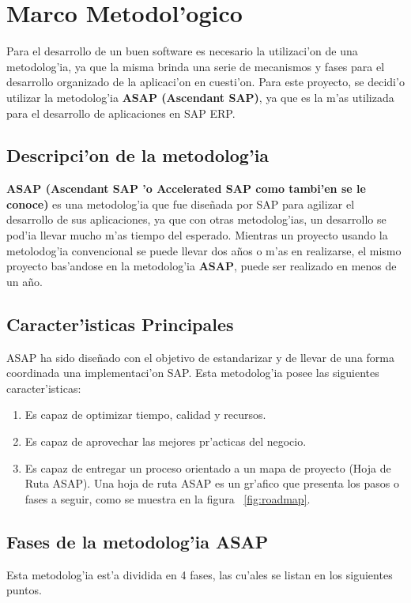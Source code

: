 \chapter{Marco Metodol'ogico} \label{chap:metodologia}
Para el desarrollo de un buen software es necesario la utilizaci'on de una metodolog'ia, ya que la misma brinda una serie de mecanismos y fases para el desarrollo organizado de la aplicaci'on en cuesti'on.
\newline
\newline
Para este proyecto, se decidi'o utilizar la metodolog'ia \textbf{ASAP (Ascendant SAP)}, ya que es la m'as utilizada para el desarrollo de aplicaciones en SAP ERP.
\section{Descripci'on de la metodolog'ia}
\textbf{ASAP (Ascendant SAP 'o Accelerated SAP como tambi'en se le conoce)} es una metodolog'ia que fue dise\~nada por SAP para agilizar el desarrollo de sus aplicaciones, ya que con otras metodolog'ias, un desarrollo se pod'ia llevar mucho m'as tiempo del esperado. Mientras un proyecto usando la metolodog'ia convencional se puede llevar dos a\~nos o m'as en realizarse, el mismo proyecto bas'andose en la metodolog'ia \textbf{ASAP}, puede ser realizado en menos de un a\~no. 

\section{Caracter'isticas Principales}
ASAP ha sido dise\~nado con el objetivo de estandarizar y de llevar de una forma coordinada una implementaci'on SAP.  Esta metodolog'ia posee las siguientes caracter'isticas:
\begin{enumerate}
\item Es capaz de optimizar tiempo, calidad y recursos.
\item Es capaz de aprovechar las mejores pr'acticas del negocio.
\item Es capaz de entregar un proceso orientado a un mapa de proyecto (Hoja de Ruta ASAP). Una hoja de ruta ASAP es un gr'afico que presenta los pasos o fases a seguir, como se muestra en la figura ~\ref{fig:roadmap}.

\end{enumerate}

\section{Fases de la metodolog'ia ASAP}
Esta metodolog'ia est'a dividida en 4 fases, las cu'ales se listan en los siguientes puntos.
